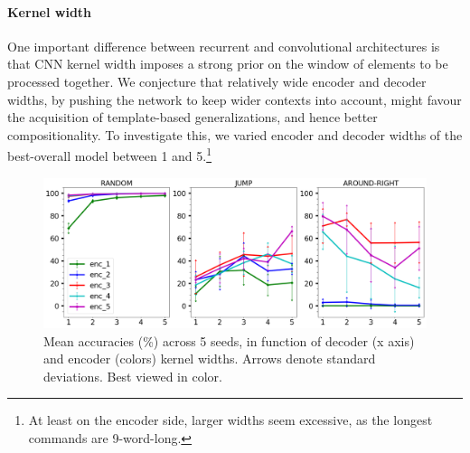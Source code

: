 \paragraph{Kernel width}
\label{subsec:exp2}

One important difference between recurrent and convolutional
architectures is that CNN kernel
width imposes a strong prior on the window of elements to be
processed together. We conjecture that relatively wide encoder and
decoder widths, by pushing the network to keep wider
contexts into account, might favour the acquisition of template-based
generalizations, and hence better compositionality. To investigate
this, we varied encoder and decoder widths of the best-overall model
between 1 and 5.\footnote{At least on the encoder side, larger widths
  seem excessive, as the longest commands are 9-word-long.}


\begin{figure}[tb]
    \centering
    \includegraphics[width=\textwidth,keepaspectratio]{figures/kernel_exp.png}
    \caption{Mean accuracies (\%) across 5 seeds, in function of decoder (x axis) and encoder (colors) kernel widths. Arrows denote standard deviations. Best viewed in color.
    }
    \label{fig:kernel_exp}
\end{figure}

